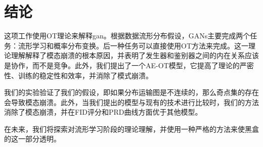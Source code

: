 
\section{结论}

这项工作使用OT理论来解释gan。根据数据流形分布假设，GANs主要完成两个任务：流形学习和概率分布变换。后一种任务可以直接使用OT方法来完成。这一理论理解解释了模态崩溃的根本原因，并表明了发生器和鉴别器之间的内在关系应该是协作，而不是竞争。此外，我们提出了一个AE-OT模型，它提高了理论的严密性、训练的稳定性和效率，并消除了模式崩溃。

我们的实验验证了我们的假设，即如果分布运输图是不连续的，那么奇点集的存在会导致模态崩溃。此外，当我们提出的模型与现有的技术进行比较时，我们的方法消除了模态崩溃，并在FID评分和PRD曲线方面优于其他模型。

在未来，我们将探索对流形学习阶段的理论理解，并使用一种严格的方法来使黑盒的这一部分透明。